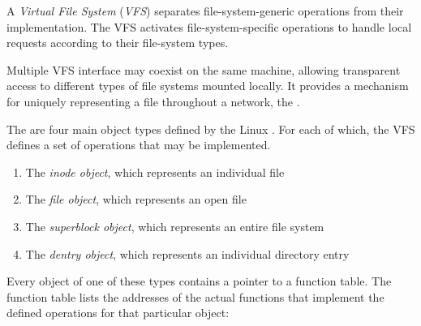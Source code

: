 \begin{definition}\label{def:Virtual_File_System}
  A \emph{Virtual File System} (\emph{VFS}) separates file-system-generic operations from their implementation.
  The VFS activates file-system-specific operations to handle local requests according to their file-system types.

  Multiple VFS interface may coexist on the same machine, allowing transparent access to different types of file systems mounted locally.
  It provides a mechanism for uniquely representing a file throughout a network, the .
\end{definition}

The are four main object types defined by the Linux .
For each of which, the VFS defines a set of operations that may be implemented.
\begin{enumerate}[noitemsep]
\item The \emph{inode object}, which represents an individual file
\item The \emph{file object}, which represents an open file
\item The \emph{superblock object}, which represents an entire file system
\item The \emph{dentry object}, which represents an individual directory entry
\end{enumerate}

Every object of one of these types contains a pointer to a function table.
The function table lists the addresses of the actual functions that implement the defined operations for that particular object:


